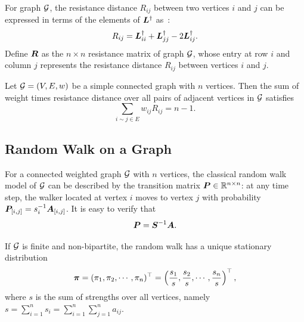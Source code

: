 \documentclass[10pt,journal,compsoc,twocolumn,twoside]{IEEEtran}
\begin{document}
For graph \(\mathcal{G}\), the resistance distance \(R_{ij}\) between two vertices \(i\) and \(j\) can be expressed in terms of the elements of \(\boldsymbol{L}^{\dagger}\) as~\cite{KlRa93}:
\begin{equation}\label{EE04}
    R_{ij}={\boldsymbol{L}}_{ii}^{\dagger}+{\boldsymbol{L}}_{jj}^{\dagger}-2{\boldsymbol{L}}_{ij}^{\dagger}.
\end{equation}
Define \(\boldsymbol{R}\) as the \(n \times n\) resistance matrix of graph \(\mathcal{G}\), whose entry at row \(i\) and column \(j\) represents the resistance distance \(R_{ij}\) between vertices \(i\) and \(j\).

\begin{lemma}\label{Foster} \cite{Te91}
    Let \(\mathcal{G}=(V,E,w)\) be a simple connected graph with \(n\) vertices. Then the sum of  weight times resistance distance over all pairs of adjacent vertices in  \(\mathcal{G}\)  satisfies
    \begin{equation*}
        \sum_{ i\sim j\in E }w_{ij}R_{ij}=n-1.
    \end{equation*}
\end{lemma}

\subsection{Random Walk on a Graph}

For a connected weighted graph \(\mathcal{G}\) with \(n\) vertices, the classical random walk model of \(\mathcal{G}\) can be described by the transition matrix \(\boldsymbol{P}\in\mathbb{R}^{n\times n}\): at any time step, the walker located at vertex \(i\) moves to vertex \(j\) with probability \({\boldsymbol{P}_{[i,j]}=s_i^{-1}\boldsymbol{A}_{[i,j]}}\).
It is easy to verify that
\begin{equation}\label{eq:trs}
    \boldsymbol{P}=\boldsymbol{S}^{-1}\boldsymbol{A}.
\end{equation}

If  \(\mathcal{G}\) is  finite and non-bipartite, the random walk  has a unique stationary distribution~\cite{LiZh13PRE}
\begin{equation}\label{EE01}
    \boldsymbol{\pi}=(\pi_1, \pi_2, \cdots, \pi_n)^{\top}=\left(\frac{s_1}{s}, \frac{s_2}{s}, \cdots, \frac{s_n}{s}\right)^{\top},
\end{equation}
where \(s\) is the sum of strengths over all vertices, namely \(s=\sum_{i=1}^n s_i=\sum_{i=1}^{n}\sum_{j=1}^{n} a_{ij}\).
\end{document}
